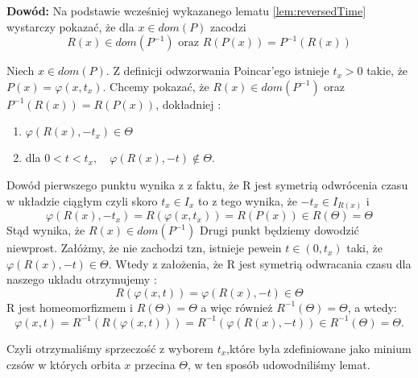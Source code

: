 \textbf{Dowód:}
Na podstawie wcześniej wykazanego lematu \eqref{lem:reversedTime} wystarczy pokazać, że dla $ x\in dom(P) $ 
zacodzi
$$
  R(x) \in dom(P^{-1}) \mbox{ oraz } R(P(x)) = P^{-1}(R(x))
$$

Niech $ x \in dom(P)$. Z definicji odwzorwania Poincar'ego istnieje $ t_x > 0 $ takie, że $ P(x) = \varphi(x,t_x)$.
Chcemy pokazać, że $ R(x) \in dom(P^{-1}) $ oraz $ P^{-1}(R(x)) = R(P(x)) $, dokładniej :
\begin{enumerate}
 \item $\varphi(R(x),-t_x) \in \Theta $
 \item dla $ 0 < t < t_x, \quad \varphi(R(x),-t) \notin \Theta$.
\end{enumerate}
Dowód pierwszego punktu wynika z z faktu, że R jest symetrią odwrócenia czasu w układzie ciągłym czyli skoro 
$ t_x \in I_x $ to z tego wynika, że  $ -t_x \in I_{R(x)} $ i 
$$
  \varphi(R(x),-t_x) = R(\varphi(x,t_x)) = R(P(x)) \in R(\Theta)= \Theta
$$
Stąd wynika, że $ R(x) \in dom(P^{-1})$ 
Drugi punkt będziemy dowodzić niewprost. Załóżmy, że nie zachodzi tzn, istnieje pewein 
$ t \in (0,t_x) $ taki, że $ \varphi(R(x),-t) \in \Theta $. Wtedy z założenia, że R
jest symetrią odwracania czasu dla naszego układu otrzymujemy :
 $$
  R(\varphi(x,t)) = \varphi(R(x), -t) \in \Theta
 $$ 
 R jest homeomorfizmem i $ R(\Theta) = \Theta $ a więc również $ R^{-1}(\Theta) = \Theta $,
 a wtedy:
 $$
    \varphi(x,t) = R^{-1}(R(\varphi(x,t))) = R^{-1}(\varphi(R(x),-t)) \in R^{-1}(\Theta) = \Theta.
 $$

 Czyli otrzymaliśmy sprzeczość z wyborem $t_x$,które była zdefiniowane jako minium czsów w których orbita $ x $ przecina $\Theta$, w ten sposób udowodniliśmy lemat.
 
